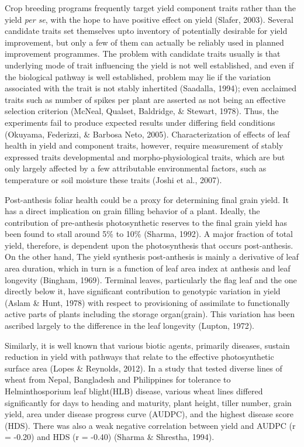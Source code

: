 \documentclass[12pt,oneside]{dukestatscithesis} %
\begin{document}
Crop breeding programs frequently target yield component traits rather than the yield \emph{per se}, with the hope to have positive effect on yield (Slafer, 2003). Several candidate traits set themselves upto inventory of potentially desirable for yield improvement, but only a few of them can actually be reliably used in planned improvement programmes. The problem with candidate traits usually is that underlying mode of trait influencing the yield is not well established, and even if the biological pathway is well established, problem may lie if the variation associated with the trait is not stably inhertited (Saadalla, 1994); even acclaimed traits such as number of spikes per plant are asserted as not being an effective selection criterion (McNeal, Qualset, Baldridge, \& Stewart, 1978). Thus, the experiments fail to produce expected results under differing field conditions (Okuyama, Federizzi, \& Barbosa Neto, 2005). Characterization of effects of leaf health in yield and component traits, however, require measurement of stably expressed traits developmental and morpho-physiological traits, which are but only largely affected by a few attributable environmental factors, such as temperature or soil moisture these traits (Joshi et al., 2007).

Post-anthesis foliar health could be a proxy for determining final grain yield. It has a direct implication on grain filling behavior of a plant. Ideally, the contribution of pre-anthesis photosynthetic reserves to the final grain yield has been found to stall around 5\% to 10\% (Sharma, 1992). A major fraction of total yield, therefore, is dependent upon the photosynthesis that occurs post-anthesis. On the other hand, The yield synthesis post-anthesis is mainly a derivative of leaf area duration, which in turn is a function of leaf area index at anthesis and leaf longevity (Bingham, 1969). Terminal leaves, particularly the flag leaf and the one directly below it, have significant contribution to genotypic variation in yield (Aslam \& Hunt, 1978) with respect to provisioning of assimilate to functionally active parts of plants including the storage organ(grain). This variation has been ascribed largely to the difference in the leaf longevity (Lupton, 1972).

Similarly, it is well known that various biotic agents, primarily diseases, sustain reduction in yield with pathways that relate to the effective photosynthetic surface area (Lopes \& Reynolds, 2012). In a study that tested diverse lines of wheat from Nepal, Bangladesh and Philippines for tolerance to Helminthosporium leaf blight(HLB) disease, various wheat lines differed significantly for days to heading and maturity, plant height, tiller number, grain yield, area under disease progress curve (AUDPC), and the highest disease score (HDS). There was also a weak negative correlation between yield and AUDPC (r = -0.20) and HDS (r = -0.40) (Sharma \& Shrestha, 1994).
\end{document}
